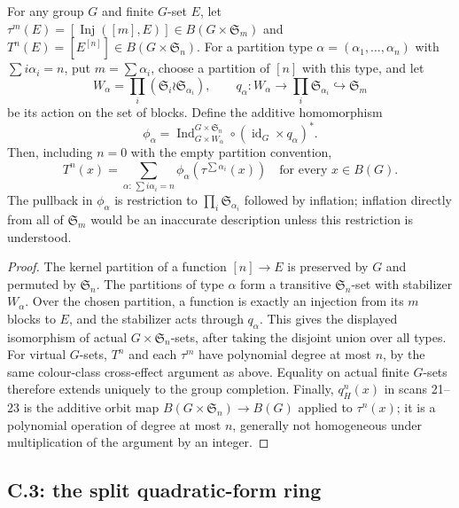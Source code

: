 \begin{proposition}
\label{C:partition_formula}
For any group $G$ and finite $G$-set $E$, let
$\tau^m(E)=[\operatorname{Inj}([m],E)]\in B(G\times\mathfrak S_m)$ and
$T^n(E)=[E^{[n]}]\in B(G\times\mathfrak S_n)$. For a partition type
$\alpha=(\alpha_1,\ldots,\alpha_n)$ with $\sum i\alpha_i=n$, put
$m=\sum\alpha_i$, choose a partition of $[n]$ with this type, and let
\[
 W_\alpha=\prod_i(\mathfrak S_i\wr\mathfrak S_{\alpha_i}),\qquad
 q_\alpha:W_\alpha\longrightarrow\prod_i\mathfrak S_{\alpha_i}
                               \hookrightarrow\mathfrak S_m
\]
be its action on the set of blocks. Define the additive homomorphism
\[
 \phi_\alpha=\operatorname{Ind}_{G\times W_\alpha}^{G\times\mathfrak S_n}
       \circ(\operatorname{id}_G\times q_\alpha)^*.
\]
Then, including $n=0$ with the empty partition convention,
\[
 T^n(x)=\sum_{\alpha:\,\sum i\alpha_i=n}\phi_\alpha(\tau^{\sum\alpha_i}(x))
 \quad\text{for every }x\in B(G).
\]
The pullback in $\phi_\alpha$ is restriction to
$\prod_i\mathfrak S_{\alpha_i}$ followed by inflation; inflation directly
from all of $\mathfrak S_m$ would be an inaccurate description unless this
restriction is understood.
\end{proposition}
\begin{proof}
The kernel partition of a function $[n]\to E$ is preserved by $G$ and
permuted by $\mathfrak S_n$. The partitions of type $\alpha$ form a
transitive $\mathfrak S_n$-set with stabilizer $W_\alpha$. Over the chosen
partition, a function is exactly an injection from its $m$ blocks to $E$,
and the stabilizer acts through $q_\alpha$. This gives the displayed
isomorphism of actual $G\times\mathfrak S_n$-sets, after taking the disjoint
union over all types. For virtual $G$-sets, $T^n$ and each $\tau^m$ have
polynomial degree at most $n$, by the same colour-class cross-effect
argument as above. Equality on actual finite $G$-sets therefore extends
uniquely to the group completion. Finally,
$q_H^n(x)$ in scans 21--23 is the additive orbit map
$B(G\times\mathfrak S_n)\to B(G)$ applied to $\tau^n(x)$;
it is a polynomial operation of degree at most $n$, generally not
homogeneous under multiplication of the argument by an integer.
\end{proof}

\subsection{C.3: the split quadratic-form ring}

